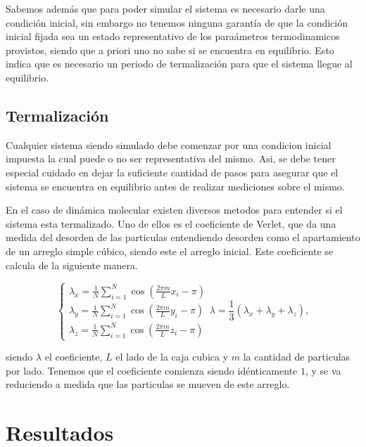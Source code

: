 \documentclass[%
 reprint,
 amsmath,amssymb,
 aps,
]{revtex4-1}
\begin{document}
Sabemos adem\'as que para poder simular el sistema es necesario darle una
condici\'on inicial, sin embargo no tenemos ninguna garant\'ia de que la
condici\'on inicial fijada sea un estado representativo de los para\'ametros
termodinamicos provistos, siendo que a priori uno no sabe si se encuentra en
equilibrio. Esto indica que es necesario un periodo de termalizaci\'on para que
el sistema llegue al equilibrio.

\subsection{Termalizaci\'on}

Cualquier sistema siendo simulado debe comenzar por una condicion inicial
impuesta la cual puede o no ser representativa del mismo. Asi, se debe tener
especial cuidado en dejar la suficiente cantidad de pasos para asegurar que el
sistema se encuentra en equilibrio antes de realizar mediciones sobre el mismo.

En el caso de din\'amica molecular existen diversos metodos para entender si
el sistema esta termalizado. Uno de ellos es el coeficiente de Verlet, que da
una medida del desorden de las particulas entendiendo desorden como el
apartamiento de un arreglo simple c\'ubico, siendo este el arreglo inicial.
Este coeficiente se calcula de la siguiente manera.

\begin{equation}
  \left \{
    \begin{matrix}
      \lambda_x = \frac{1}{N} \sum_{i = 1}^N \cos \left( \frac{2 \pi m}{L} x_i - \pi \right) \\
      \lambda_y = \frac{1}{N} \sum_{i = 1}^N \cos \left( \frac{2 \pi m}{L} y_i - \pi \right) \\
      \lambda_z = \frac{1}{N} \sum_{i = 1}^N \cos \left( \frac{2 \pi m}{L} z_i - \pi \right)
    \end{matrix}
    \lambda = \frac{1}{3} (\lambda_x + \lambda_y + \lambda_z) ,
  \right .
\end{equation}

siendo $\lambda$ el coeficiente, $L$ el lado de la caja cubica y $m$ la
cantidad de particulas por lado. Tenemos que el coeficiente comienza siendo
id\'enticamente $1$, y se va reduciendo a medida que las particulas se mueven
de este arreglo.


\section{Resultados}
\end{document}
